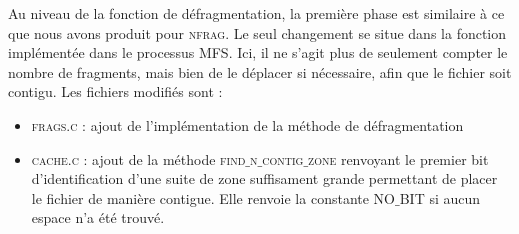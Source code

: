 Au niveau de la fonction de défragmentation, la première phase est similaire à ce que nous avons produit pour \textsc{nfrag}. Le seul changement se situe dans la fonction implémentée dans le processus \textsc{MFS}. Ici, il ne s'agit plus de seulement compter le nombre de fragments, mais bien de le déplacer si nécessaire, afin que le fichier soit contigu. Les fichiers modifiés sont : \begin{itemize}
\item \textsc{frags.c} : ajout de l'implémentation de la méthode de défragmentation
\item \textsc{cache.c} : ajout de la méthode \textsc{find$\_$n$\_$contig$\_$zone} renvoyant le premier bit d'identification d'une suite de zone suffisament grande permettant de placer le fichier de manière contigue. Elle renvoie la constante \textsc{NO$\_$BIT} si aucun espace n'a été trouvé.
\end{itemize}
